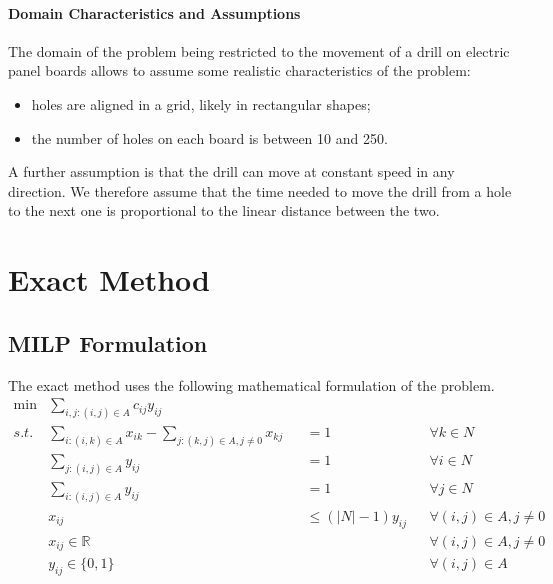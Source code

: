 \documentclass{article}
\begin{document}
\paragraph{Domain Characteristics and Assumptions}
The domain of the problem being restricted to the movement of a drill on electric panel boards allows to assume some realistic characteristics of the problem:
\begin{itemize}
    \item holes are aligned in a grid, likely in rectangular shapes;
    \item the number of holes on each board is between 10 and 250.
\end{itemize}
A further assumption is that the drill can move at constant speed in any direction.
We therefore assume that the time needed to move the drill from a hole to the next one is proportional to the linear distance between the two.

\section{Exact Method}
\label{sec:exact}

\subsection{MILP Formulation}
The exact method uses the following mathematical formulation of the problem.
\begin{align}
    \min & \sum_{i,j : (i,j) \in A} c_{i j} y_{i j}                                                                                                 \\
    \label{MILP:consume}
    s.t. & \sum_{i : (i,k) \in A} x_{i k} - \sum_{j : (k,j) \in A, j \neq 0} x_{k j} &  & = 1                    &  & \forall k \in N               \\
    \label{MILP:output}
         & \sum_{j : (i,j) \in A} y_{i j}                                            &  & = 1                    &  & \forall i \in N               \\
    \label{MILP:input}
         & \sum_{i : (i,j) \in A} y_{i j}                                            &  & = 1                    &  & \forall j \in N               \\
    \label{MILP:activation}
         & x_{i j}                                                                   &  & \leq (|N| - 1) y_{i j} &  & \forall (i,j) \in A, j \neq 0 \\
         & x_{i j} \in \mathbb{R}                                                    &  &                        &  & \forall (i,j) \in A, j \neq 0 \\
         & y_{i j} \in \{0, 1\}                                                      &  &                        &  & \forall (i,j) \in A
\end{align}
\end{document}
